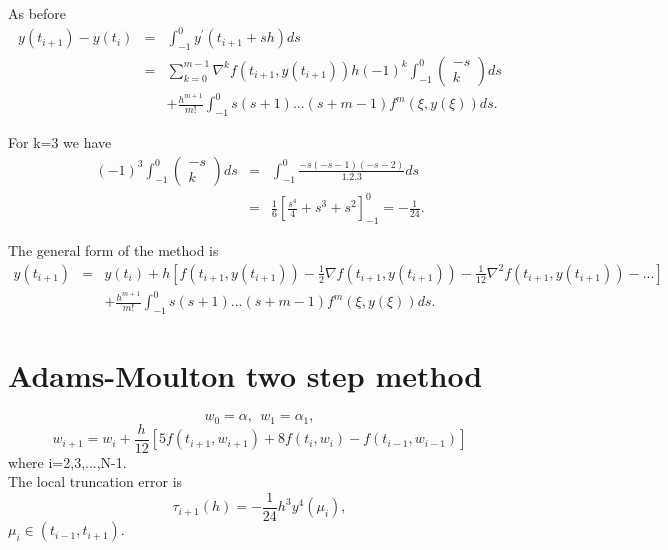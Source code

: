 As before
\begin{eqnarray*}
y(t_{i+1})-y(t_{i}) &=& \int_{-1}^{0} y^{'}(t_{i+1}+sh) ds\\
&=&
\sum_{k=0}^{m-1}\nabla^k  f(t_{i+1},y(t_{i+1}))h(-1)^k\int_{-1}^{0}\left(\begin{array}{c}-s \\ k \end{array}\right)ds\\
& &+\frac{h^{m+1}}{m!}\int_{-1}^{0}s(s+1)...(s+m-1)f^{m}(\xi,y(\xi))ds.
\end{eqnarray*}
\begin{example}
For k=3 we have 
\begin{eqnarray*}
(-1)^3\int_{-1}^{0}\left(\begin{array}{c}-s \\ k \end{array}\right)ds
&=& \int_{-1}^{0} \frac{-s(-s-1)(-s-2)}{1.2.3}ds\\
&=& \frac{1}{6} \left[ \frac{s^4}{4}+s^3+s^2\right]^{0}_{-1}=-\frac{1}{24}.
\end{eqnarray*}
\end{example}
The general form of the  method is 
\begin{eqnarray*}
y(t_{i+1}) &=&y(t_i)+ h[f(t_{i+1},y(t_{i+1}))-\frac{1}{2}\nabla f(t_{i+1},y(t_{i+1}))-\frac{1}{12}\nabla^2 f(t_{i+1},y(t_{i+1})) - ... ]\\
& & +\frac{h^{m+1}}{m!}\int_{-1}^{0}s(s+1)...(s+m-1)f^{m}(\xi,y(\xi))ds.
\end{eqnarray*}

\section*{Adams-Moulton two step method}
\[ w_0=\alpha, \ \ w_1=\alpha_1,  \]
\[w_{i+1} = w_{i}+\frac{h}{12}[5f(t_{i+1},w_{i+1}) +8 f(t_{i},w_{i})-f(t_{i-1},w_{i-1})] \]
where i=2,3,...,N-1.\\
The local truncation error is 
\[\tau_{i+1}(h) =-\frac{1}{24}h^3 y^4(\mu_i),\]
$\mu_i \in (t_{i-1},t_{i+1}).$

